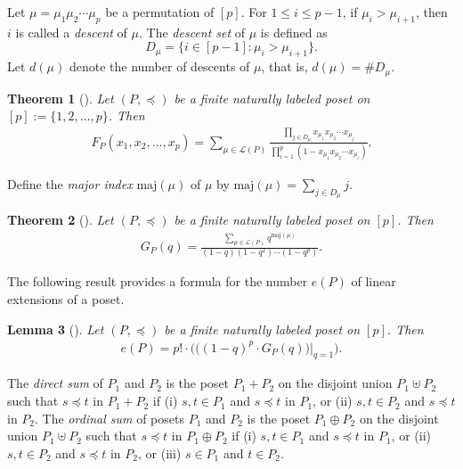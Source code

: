 \documentclass[reqno, 12pt]{article}
\newtheorem{thm}{Theorem}[section]
\newtheorem{lem}[thm]{Lemma}
\theoremstyle{mydefinition}
\theoremstyle{myremark}
\numberwithin{algorithm}{section}
\begin{document}
Let $\mu=\mu_1\mu_2\cdots \mu_p$ be a permutation of $[p]$. For $1\leq i\leq p-1$, if $\mu_i>\mu_{i+1}$, then $i$ is called a \emph{descent} of $\mu$.
The \emph{descent set} of $\mu$ is defined as
$$D_{\mu} = \{ i \in [p-1] : \mu_i > \mu_{i+1} \}.$$
Let $d(\mu)$ denote the number of descents of $\mu$, that is, $d(\mu) = \# D_{\mu}$.


\begin{thm}[]
Let $(P,\preceq)$ be a finite naturally labeled poset on $[p]:=\{1,2,\ldots,p\}$. Then
\begin{align*}
F_P(x_1,x_2,\ldots, x_p)=\sum_{\mu\in \mathcal{L}(P)}\frac{\prod_{j\in D_{\mu}}x_{\mu_1}x_{\mu_2}\cdots x_{\mu_j}}{\prod_{i=1}^p (1-x_{\mu_1}x_{\mu_2}\cdots x_{\mu_i})}.
\end{align*}
\end{thm}

Define the \emph{major index} $\mathrm{maj}(\mu)$ of $\mu$ by $\mathrm{maj}(\mu)=\sum_{j\in D_{\mu}} j$.
\begin{thm}[]
Let $(P,\preceq)$ be a finite naturally labeled poset on $[p]$. Then
\begin{align*}
G_P(q)=\frac{\sum_{\mu\in \mathcal{L}(P)} q^{\mathrm{maj}(\mu)}}{(1-q)(1-q^2)\cdots (1-q^p)}.
\end{align*}
\end{thm}


The following result provides a formula for the number $e(P)$ of linear extensions of a poset.
\begin{lem}[]\label{Formula-ep-EC1}
Let $(P,\preceq)$ be a finite naturally labeled poset on $[p]$. Then
\begin{align}
e(P)=p!\cdot \bigg(\Big((1-q)^p\cdot G_P(q) \Big)\Big|_{q=1}\bigg).\label{linearExtension}
\end{align}
\end{lem}


The \emph{direct sum} of $P_1$ and $P_2$ is the poset $P_1+ P_2$ on the disjoint union $P_1 \uplus P_2$ such that $s\preceq t$ in $P_1+ P_2$ if (i) $s,t\in P_1$ and $s\preceq t$ in $P_1$, or (ii) $s,t\in P_2$ and $s\preceq t$ in $P_2$.
The \emph{ordinal sum} of posets $P_1$ and $P_2$ is the poset $P_1\oplus P_2$ on the disjoint union $P_1 \uplus P_2$ such that $s\preceq t$ in $P_1 \oplus P_2$ if (i) $s,t\in P_1$ and $s\preceq t$ in $P_1$, or (ii) $s,t\in P_2$ and $s\preceq t$ in $P_2$, or (iii) $s\in P_1$ and $t\in P_2$.
\end{document}

